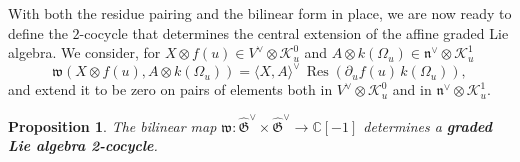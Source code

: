 \documentclass[11pt]{amsart}
\newcommand{\C}{{\mathbb C}}
\newcommand{\CK}{{\mathcal K}}
\newcommand{\fn}{\mathfrak{n}}
\newcommand{\fG}{\mathfrak{G}}
\numberwithin{equation}{section}
\numberwithin{figure}{section}
\numberwithin{table}{section}
\theoremstyle{thm}
\newtheorem{prop}[theorem]{Proposition}
\numberwithin{equation}{subsection}
\theoremstyle{definition}
\theoremstyle{rem}
\begin{document}
With both the residue pairing and the bilinear form in place, we are now ready to define the $2$-cocycle that determines the central extension of the affine graded Lie algebra. We consider, for $X \otimes f(u)\in V^\vee \otimes \CK_u^0$ and $A \otimes k(\Omega_u)\in \fn^\vee \otimes \CK_u^1$
\begin{equation}
\label{ec:2cocycledef}
    \mathfrak{w}(X \otimes f(u), A \otimes k(\Omega_u)) = \langle X, A \rangle^\vee \, \operatorname{Res}\left( \partial_u f(u) \, k(\Omega_u) \right),
\end{equation}
and extend it to be zero on pairs of elements both in \(V^\vee \otimes \CK_u^0\) and in \(\fn^\vee \otimes \CK_u^1\). 
\begin{prop}
    The bilinear map $\mathfrak{w} : \widehat{\fG}^\vee\times \widehat{\fG}^\vee \to \C[-1]$ determines a \textbf{graded Lie algebra 2-cocycle}. 
\end{prop}
\end{document}
